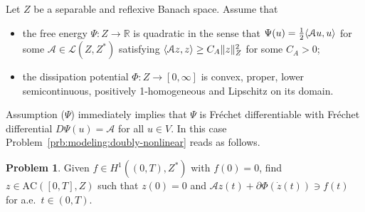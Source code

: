 \documentclass[a4paper,10pt,oneside]{amsbook}
\numberwithin{section}{chapter}
\numberwithin{equation}{chapter}
\theoremstyle{definition}
\newtheorem{prb}[prop]{Problem}
\DeclarePairedDelimiter{\norm}{\lVert}{\rVert}
\DeclarePairedDelimiter{\dual}{\langle}{\rangle}
\begin{document}
Let $Z$ be a separable and reflexive Banach space. Assume that 
\begin{itemize}
\item[($\Psi$)] the free energy $\Psi\colon Z\to\mathbb{R}$ is quadratic in the sense that $\Psi(u)=\frac{1}{2}\dual{\mathcal{A}u,u}$ for some $\mathcal{A}\in\mathscr{L}(Z,Z^*)$ satisfying $\dual{\mathcal{A}z,z}\ge C_A\norm{z}_Z^2$ for some $C_A>0$;
\item[($\Phi$)] the dissipation potential $\Phi\colon Z\to[0,\infty]$ is convex, proper, lower semicontinuous, positively 1-homogeneous and Lipschitz on its domain.
\end{itemize}
Assumption ($\Psi$) immediately implies that $\Psi$ is Fréchet differentiable with Fréchet differential $D\Psi(u)=\mathcal{A}$ for all $u\in V$. In this case Problem~\ref{prb:modeling:doubly-nonlinear} reads as follows.
\begin{prb}
\label{prb:evi}
Given $f\in H^1((0,T),Z^*)$ with $f(0)=0$, find $z\in\text{AC}([0,T],Z)$ such that $z(0)=0$ and $\mathcal{A}z(t)+\partial\Phi(\dot z(t))\ni f(t)$
for a.e.\ $t\in(0,T)$.
\end{prb}
\end{document}
